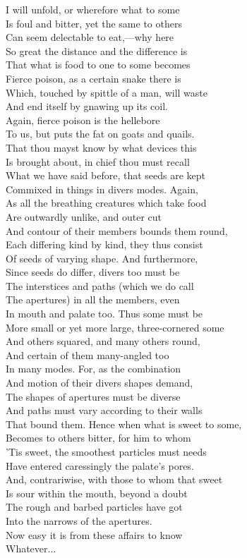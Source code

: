 I will unfold, or wherefore what to some\\
Is foul and bitter, yet the same to others\\
Can seem delectable to eat,—why here\\
So great the distance and the difference is\\
That what is food to one to some becomes\\
Fierce poison, as a certain snake there is\\
Which, touched by spittle of a man, will waste\\
And end itself by gnawing up its coil.\\
Again, fierce poison is the hellebore\\
To us, but puts the fat on goats and quails.\\
That thou mayst know by what devices this\\
Is brought about, in chief thou must recall\\
What we have said before, that seeds are kept\\
Commixed in things in divers modes. Again,\\
As all the breathing creatures which take food\\
Are outwardly unlike, and outer cut\\
And contour of their members bounds them round,\\
Each differing kind by kind, they thus consist\\
Of seeds of varying shape. And furthermore,\\
Since seeds do differ, divers too must be\\
The interstices and paths (which we do call\\
The apertures) in all the members, even\\
In mouth and palate too. Thus some must be\\
More small or yet more large, three-cornered some\\
And others squared, and many others round,\\
And certain of them many-angled too\\
In many modes. For, as the combination\\
And motion of their divers shapes demand,\\
The shapes of apertures must be diverse\\
And paths must vary according to their walls\\
That bound them. Hence when what is sweet to some,\\
Becomes to others bitter, for him to whom\\
'Tis sweet, the smoothest particles must needs\\
Have entered caressingly the palate's pores.\\
And, contrariwise, with those to whom that sweet\\
Is sour within the mouth, beyond a doubt\\
The rough and barbed particles have got\\
Into the narrows of the apertures.\\
Now easy it is from these affairs to know\\
Whatever...

